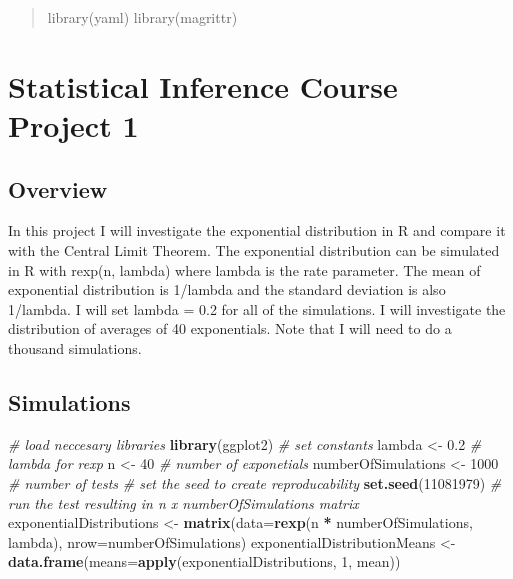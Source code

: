 \documentclass[
]{article}
\author{}
\date{\vspace{-2.5em}}
\newenvironment{Shaded}{\begin{snugshade}}{\end{snugshade}}
\newcommand{\CommentTok}[1]{\textcolor[rgb]{0.56,0.35,0.01}{\textit{#1}}}
\newcommand{\DataTypeTok}[1]{\textcolor[rgb]{0.13,0.29,0.53}{#1}}
\newcommand{\DecValTok}[1]{\textcolor[rgb]{0.00,0.00,0.81}{#1}}
\newcommand{\FloatTok}[1]{\textcolor[rgb]{0.00,0.00,0.81}{#1}}
\newcommand{\KeywordTok}[1]{\textcolor[rgb]{0.13,0.29,0.53}{\textbf{#1}}}
\newcommand{\NormalTok}[1]{#1}
\newcommand{\OperatorTok}[1]{\textcolor[rgb]{0.81,0.36,0.00}{\textbf{#1}}}
\newcommand{\StringTok}[1]{\textcolor[rgb]{0.31,0.60,0.02}{#1}}
\begin{document}
\begin{quote}
library(yaml) library(magrittr)
\end{quote}

\hypertarget{statistical-inference-course-project-1}{%
\section{Statistical Inference Course Project
1}\label{statistical-inference-course-project-1}}

\hypertarget{overview}{%
\subsection{Overview}\label{overview}}

In this project I will investigate the exponential distribution in R and
compare it with the Central Limit Theorem. The exponential distribution
can be simulated in R with rexp(n, lambda) where lambda is the rate
parameter. The mean of exponential distribution is 1/lambda and the
standard deviation is also 1/lambda. I will set lambda = 0.2 for all of
the simulations. I will investigate the distribution of averages of 40
exponentials. Note that I will need to do a thousand simulations.

\hypertarget{simulations}{%
\subsection{Simulations}\label{simulations}}

\begin{Shaded}
\begin{Highlighting}[]
\CommentTok{# load neccesary libraries}
\KeywordTok{library}\NormalTok{(ggplot2)}
\CommentTok{# set constants}
\NormalTok{lambda <-}\StringTok{ }\FloatTok{0.2} \CommentTok{# lambda for rexp}
\NormalTok{n <-}\StringTok{ }\DecValTok{40} \CommentTok{# number of exponetials}
\NormalTok{numberOfSimulations <-}\StringTok{ }\DecValTok{1000} \CommentTok{# number of tests}
\CommentTok{# set the seed to create reproducability}
\KeywordTok{set.seed}\NormalTok{(}\DecValTok{11081979}\NormalTok{)}
\CommentTok{# run the test resulting in n x numberOfSimulations matrix}
\NormalTok{exponentialDistributions <-}\StringTok{ }\KeywordTok{matrix}\NormalTok{(}\DataTypeTok{data=}\KeywordTok{rexp}\NormalTok{(n }\OperatorTok{*}\StringTok{ }\NormalTok{numberOfSimulations, lambda), }\DataTypeTok{nrow=}\NormalTok{numberOfSimulations)}
\NormalTok{exponentialDistributionMeans <-}\StringTok{ }\KeywordTok{data.frame}\NormalTok{(}\DataTypeTok{means=}\KeywordTok{apply}\NormalTok{(exponentialDistributions, }\DecValTok{1}\NormalTok{, mean))}
\end{Highlighting}
\end{Shaded}
\end{document}
